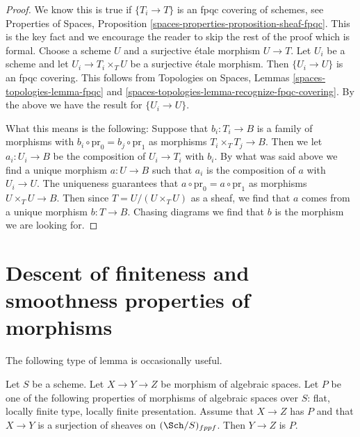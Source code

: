 \begin{proof}
We know this is true if $\{T_i \to T\}$ is an fpqc covering of
schemes, see Properties of Spaces, Proposition
\ref{spaces-properties-proposition-sheaf-fpqc}.
This is the key fact and we encourage the reader to skip the rest
of the proof which is formal. Choose a scheme $U$ and a surjective
\'etale morphism
$U \to T$. Let $U_i$ be a scheme and let $U_i \to T_i \times_T U$
be a surjective \'etale morphism. Then $\{U_i \to U\}$ is an
fpqc covering. This follows from
Topologies on Spaces, Lemmas \ref{spaces-topologies-lemma-fpqc} and
\ref{spaces-topologies-lemma-recognize-fpqc-covering}.
By the above we have the result for $\{U_i \to U\}$.

\medskip\noindent
What this means is the following: Suppose that $b_i : T_i \to B$
is a family of morphisms with
$b_i \circ \text{pr}_0 = b_j \circ \text{pr}_1$ as morphisms
$T_i \times_T T_j \to B$. Then we let $a_i : U_i \to B$ be the
composition of $U_i \to T_i$ with $b_i$. By what was said above
we find a unique morphism $a : U \to B$ such that
$a_i$ is the composition of $a$ with $U_i \to U$.
The uniqueness guarantees that $a \circ \text{pr}_0 = a \circ \text{pr}_1$
as morphisms $U \times_T U \to B$. Then since $T = U/(U \times_T U)$
as a sheaf, we find that $a$ comes from a unique morphism $b : T \to B$.
Chasing diagrams we find that $b$ is the morphism we are looking for.
\end{proof}










\section{Descent of finiteness and smoothness properties of morphisms}
\label{section-descent-finiteness-morphisms}

\noindent
The following type of lemma is occasionally useful.

\begin{lemma}
\label{lemma-curiosity}
Let $S$ be a scheme. Let $X \to Y \to Z$ be morphism of algebraic spaces.
Let $P$ be one of the following properties of morphisms of algebraic spaces
over $S$:
flat, locally finite type, locally finite presentation.
Assume that $X \to Z$ has $P$ and that
$X \to Y$ is a surjection of sheaves on $(\Sch/S)_{fppf}$.
Then $Y \to Z$ is $P$.
\end{lemma}

